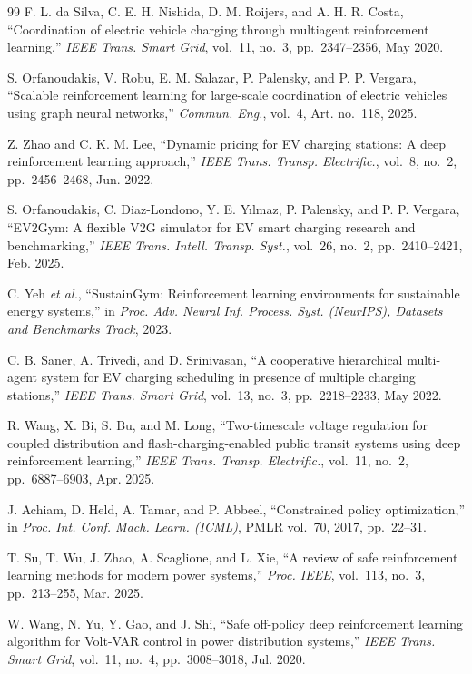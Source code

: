 \begin{thebibliography}{99}
 F. L. da Silva, C. E. H. Nishida, D. M. Roijers, and A. H. R. Costa, ``Coordination of electric vehicle charging through multiagent reinforcement learning,'' \emph{IEEE Trans. Smart Grid}, vol.~11, no.~3, pp.~2347--2356, May 2020.

 S. Orfanoudakis, V. Robu, E. M. Salazar, P. Palensky, and P. P. Vergara, ``Scalable reinforcement learning for large-scale coordination of electric vehicles using graph neural networks,'' \emph{Commun. Eng.}, vol.~4, Art. no.~118, 2025.

 Z. Zhao and C. K. M. Lee, ``Dynamic pricing for EV charging stations: A deep reinforcement learning approach,'' \emph{IEEE Trans. Transp. Electrific.}, vol.~8, no.~2, pp.~2456--2468, Jun. 2022.

 S. Orfanoudakis, C. Diaz-Londono, Y. E. Y{\i}lmaz, P. Palensky, and P. P. Vergara, ``EV2Gym: A flexible V2G simulator for EV smart charging research and benchmarking,'' \emph{IEEE Trans. Intell. Transp. Syst.}, vol.~26, no.~2, pp.~2410--2421, Feb. 2025.

 C. Yeh \emph{et al.}, ``SustainGym: Reinforcement learning environments for sustainable energy systems,'' in \emph{Proc. Adv. Neural Inf. Process. Syst. (NeurIPS), Datasets and Benchmarks Track}, 2023.

 C. B. Saner, A. Trivedi, and D. Srinivasan, ``A cooperative hierarchical multi-agent system for EV charging scheduling in presence of multiple charging stations,'' \emph{IEEE Trans. Smart Grid}, vol.~13, no.~3, pp.~2218--2233, May 2022.

 R. Wang, X. Bi, S. Bu, and M. Long, ``Two-timescale voltage regulation for coupled distribution and flash-charging-enabled public transit systems using deep reinforcement learning,'' \emph{IEEE Trans. Transp. Electrific.}, vol.~11, no.~2, pp.~6887--6903, Apr. 2025.

 J. Achiam, D. Held, A. Tamar, and P. Abbeel, ``Constrained policy optimization,'' in \emph{Proc. Int. Conf. Mach. Learn. (ICML)}, PMLR vol.~70, 2017, pp.~22--31.

 T. Su, T. Wu, J. Zhao, A. Scaglione, and L. Xie, ``A review of safe reinforcement learning methods for modern power systems,'' \emph{Proc. IEEE}, vol.~113, no.~3, pp.~213--255, Mar. 2025.

 W. Wang, N. Yu, Y. Gao, and J. Shi, ``Safe off-policy deep reinforcement learning algorithm for Volt-VAR control in power distribution systems,'' \emph{IEEE Trans. Smart Grid}, vol.~11, no.~4, pp.~3008--3018, Jul. 2020.


\end{thebibliography}

